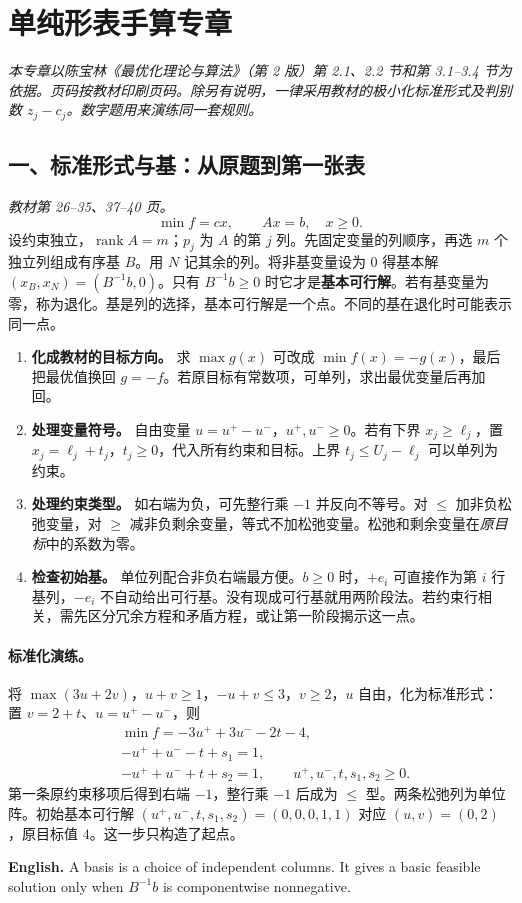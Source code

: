 \documentclass[UTF8,11pt,a4paper]{ctexart}
\newcommand{\EN}[1]{\par\noindent \textbf{English.} #1\par}
\begin{document}
\section*{单纯形表手算专章}
\label{opt:tableau}
\noindent\textit{本专章以陈宝林《最优化理论与算法》（第 2 版）第 2.1、2.2 节和第 3.1--3.4 节为依据。页码按教材印刷页码。除另有说明，一律采用教材的极小化标准形式及判别数 $z_j-c_j$。数字题用来演练同一套规则。}

\subsection*{一、标准形式与基：从原题到第一张表}
\noindent\textit{教材第 26--35、37--40 页。}
\[
  \min f=cx,\qquad Ax=b,\quad x\ge0.
\]
设约束独立，$\operatorname{rank}A=m$；$p_j$ 为 $A$ 的第 $j$ 列。先固定变量的列顺序，再选 $m$ 个独立列组成有序基 $B$。用 $N$ 记其余的列。将非基变量设为 $0$ 得基本解 $(x_B,x_N)=(B^{-1}b,0)$。只有 $B^{-1}b\ge0$ 时它才是\textbf{基本可行解}。若有基变量为零，称为退化。基是列的选择，基本可行解是一个点。不同的基在退化时可能表示同一点。

\begin{enumerate}
\item \textbf{化成教材的目标方向。} 求 $\max g(x)$ 可改成 $\min f(x)=-g(x)$，最后把最优值换回 $g=-f$。若原目标有常数项，可单列，求出最优变量后再加回。
\item \textbf{处理变量符号。} 自由变量 $u=u^+-u^-$，$u^+,u^-\ge0$。若有下界 $x_j\ge\ell_j$，置 $x_j=\ell_j+t_j$，$t_j\ge0$，代入所有约束和目标。上界 $t_j\le U_j-\ell_j$ 可以单列为约束。
\item \textbf{处理约束类型。} 如右端为负，可先整行乘 $-1$ 并反向不等号。对 $\le$ 加非负松弛变量，对 $\ge$ 减非负剩余变量，等式不加松弛变量。松弛和剩余变量在\emph{原目标}中的系数为零。
\item \textbf{检查初始基。} 单位列配合非负右端最方便。$b\ge0$ 时，$+e_i$ 可直接作为第 $i$ 行基列，$-e_i$ 不自动给出可行基。没有现成可行基就用两阶段法。若约束行相关，需先区分冗余方程和矛盾方程，或让第一阶段揭示这一点。
\end{enumerate}

\paragraph{标准化演练。}
将 $\max(3u+2v)$，$u+v\ge1$，$-u+v\le3$，$v\ge2$，$u$ 自由，化为标准形式：置 $v=2+t$、$u=u^+-u^-$，则
\[
\begin{aligned}
 &\min f=-3u^++3u^--2t-4,\\
 &-u^++u^--t+s_1=1,\\
 &-u^++u^-+t+s_2=1,\qquad u^+,u^-,t,s_1,s_2\ge0 .
\end{aligned}
\]
第一条原约束移项后得到右端 $-1$，整行乘 $-1$ 后成为 $\le$ 型。两条松弛列为单位阵。初始基本可行解 $(u^+,u^-,t,s_1,s_2)=(0,0,0,1,1)$ 对应 $(u,v)=(0,2)$，原目标值 $4$。这一步只构造了起点。
\EN{A basis is a choice of independent columns. It gives a basic feasible solution only when $B^{-1}b$ is componentwise nonnegative.}
\end{document}
